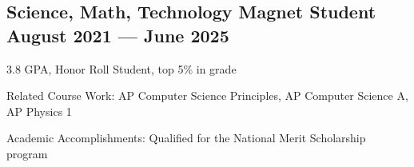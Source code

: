 
\subsection{{Science, Math, Technology Magnet Student \hfill August 2021 --- June 2025}}
\begin{zitemize}
\item 3.8 GPA, Honor Roll Student, top 5\% in grade
\item Related Course Work: AP Computer Science Principles, AP Computer Science A, AP Physics 1
\item Academic Accomplishments: Qualified for the National Merit Scholarship program
\end{zitemize}




